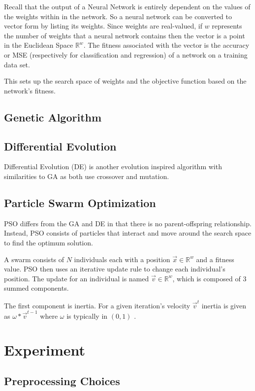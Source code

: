\documentclass[twoside,10pt]{article}
\newcommand{\Rw}{\mathbb{R}^w }
\begin{document}
	Recall that the output of a Neural Network is entirely dependent on the values of the weights within in the network. 
	So a neural network can be converted to vector form by listing its weights.
	Since weights are real-valued, if $w$ represents the number of weights that a neural network contains then the vector is a point in the Euclidean Space $\mathbb{R}^w$. 
	The fitness associated with the vector is the accuracy or MSE (respectively for classification and regression) of a network on a training data set. 
	
	This sets up the search space of weights and the objective function based on the network's fitness.

\subsection{Genetic Algorithm}

\subsection{Differential Evolution}
Differential Evolution (DE) is another evolution inspired algorithm with  similarities to GA as both use crossover and mutation.  
\subsection{Particle Swarm Optimization}

	PSO differs from the GA and DE in that there is no parent-offspring relationship. Instead, PSO consists of particles that interact and move around the search space to find the optimum solution. 
	
	A swarm consists of $N$ individuals each with a position $\vec{x} \in \Rw$ and a fitness value. 
	PSO then uses an iterative update rule to change each individual's position. The update for an individual is named $\vec{v} \in \Rw$, which is composed of 3 summed components.
	
	The first component is inertia. For a given iteration's velocity $\vec{v}^t$ inertia is given as $\omega * \vec{v}^{t-1}$ where $\omega$ is typically in $(0,1)$ \citep{empirical-pso}.

\section{Experiment}

\subsection{Preprocessing Choices}
\end{document}
